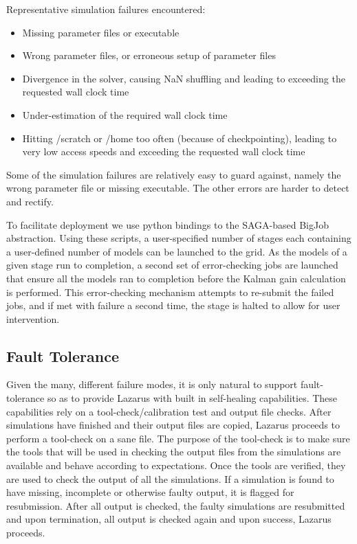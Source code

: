 \documentclass{sig-alternate}
\begin{document}
Representative simulation failures encountered:
\begin{itemize}\addtolength{\itemsep}{-0.8\baselineskip}
\item{Missing parameter files or executable}
\item{Wrong parameter files, or erroneous setup of parameter files}
\item{Divergence in the solver, causing NaN shuffling and leading to exceeding the requested wall clock time}
\item{Under-estimation of the required wall clock time}
\item{Hitting /scratch or /home too often (because of checkpointing), leading to very low access speeds and exceeding the requested wall clock time}
\end{itemize}
Some of the simulation failures are relatively easy to guard against,
namely the wrong parameter file or missing executable. The other
errors are harder to detect and rectify.

To facilitate deployment we use python bindings to the SAGA-based
BigJob abstraction. Using these scripts, a user-specified number of
stages each containing a user-defined number of models can be launched
to the grid. As the models of a given stage run to completion, a
second set of error-checking jobs are launched that ensure all the
models ran to completion before the Kalman gain calculation is
performed. This error-checking mechanism attempts to re-submit the
failed jobs, and if met with failure a second time, the stage is
halted to allow for user intervention.

\subsection{Fault Tolerance}
Given the many, different failure modes, it is only natural to support
fault-tolerance so as to provide Lazarus with built in self-healing
capabilities. These capabilities rely on a tool-check/calibration test
and output file checks. After simulations have finished and their
output files are copied, Lazarus proceeds to perform a tool-check
on a sane file. The purpose of the tool-check is to make sure the
tools that will be used in checking the output files from the
simulations are available and behave according to expectations. Once
the tools are verified, they are used to check the output of all the
simulations. If a simulation is found to have missing, incomplete or
otherwise faulty output, it is flagged for resubmission.  After all
output is checked, the faulty simulations are resubmitted and upon
termination, all output is checked again and upon success, Lazarus
proceeds.
\end{document}
